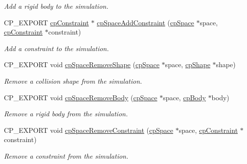 \begin{DoxyCompactItemize}
\begin{DoxyCompactList}\small\item\em Add a rigid body to the simulation. \end{DoxyCompactList}\item 
\mbox{\label{group__cpSpace_ga2d2ddb030b45f59f294ee72ba945891a}} 
C\+P\+\_\+\+E\+X\+P\+O\+RT \hyperlink{structcpConstraint}{cp\+Constraint} $\ast$ \hyperlink{group__cpSpace_ga2d2ddb030b45f59f294ee72ba945891a}{cp\+Space\+Add\+Constraint} (\hyperlink{structcpSpace}{cp\+Space} $\ast$space, \hyperlink{structcpConstraint}{cp\+Constraint} $\ast$constraint)
\begin{DoxyCompactList}\small\item\em Add a constraint to the simulation. \end{DoxyCompactList}\item 
\mbox{\label{group__cpSpace_gadd58c37e69a7575b829e25ed3c427fc8}} 
C\+P\+\_\+\+E\+X\+P\+O\+RT void \hyperlink{group__cpSpace_gadd58c37e69a7575b829e25ed3c427fc8}{cp\+Space\+Remove\+Shape} (\hyperlink{structcpSpace}{cp\+Space} $\ast$space, \hyperlink{structcpShape}{cp\+Shape} $\ast$shape)
\begin{DoxyCompactList}\small\item\em Remove a collision shape from the simulation. \end{DoxyCompactList}\item 
\mbox{\label{group__cpSpace_ga3375e5b056a887baaedd75fa1403d1cf}} 
C\+P\+\_\+\+E\+X\+P\+O\+RT void \hyperlink{group__cpSpace_ga3375e5b056a887baaedd75fa1403d1cf}{cp\+Space\+Remove\+Body} (\hyperlink{structcpSpace}{cp\+Space} $\ast$space, \hyperlink{structcpBody}{cp\+Body} $\ast$body)
\begin{DoxyCompactList}\small\item\em Remove a rigid body from the simulation. \end{DoxyCompactList}\item 
\mbox{\label{group__cpSpace_gaeec0e391838c99b4b3cbd49d5f28e609}} 
C\+P\+\_\+\+E\+X\+P\+O\+RT void \hyperlink{group__cpSpace_gaeec0e391838c99b4b3cbd49d5f28e609}{cp\+Space\+Remove\+Constraint} (\hyperlink{structcpSpace}{cp\+Space} $\ast$space, \hyperlink{structcpConstraint}{cp\+Constraint} $\ast$constraint)
\begin{DoxyCompactList}\small\item\em Remove a constraint from the simulation. \end{DoxyCompactList}\item 

\end{DoxyCompactItemize}
